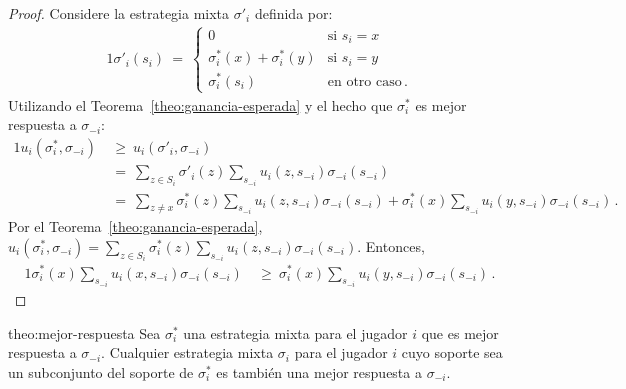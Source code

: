 \begin{proof}
Considere la estrategia mixta $\sigma'_i$ definida por:
\begin{alignat}{1}
	\sigma'_{i}(s_i)\ =\  
	\begin{cases}
		0 &  \text{si } s_i = x \\
		\sigma^*_i(x) + \sigma^*_i(y) & \text{si } s_i = y \\
		\sigma^*_i(s_i) & \text{en otro caso} \,. 
	\end{cases}
\end{alignat}
Utilizando el Teorema~\ref{theo:ganancia-esperada} y el hecho que $\sigma^*_i$ es mejor respuesta a $\sigma_{-i}$:
\begin{alignat}{1}
  u_i(\sigma^*_i, \sigma_{-i})\ 
    &\geq\ u_i(\sigma'_i, \sigma_{-i}) \\
    &=\ \sum_{z \in S_i} \sigma'_i(z) \sum_{s_{-i}} u_i(z,s_{-i}) \sigma_{-i}(s_{-i}) \\
    &=\ \sum_{z\neq x} \sigma^*_i(z) \sum_{s_{-i}} u_i(z,s_{-i}) \sigma_{-i}(s_{-i}) + \sigma^*_i(x)\sum_{s_{-i}} u_i(y,s_{-i})\sigma_{-i}(s_{-i}) \,.
\end{alignat}
Por el Teorema~\ref{theo:ganancia-esperada},
$u_i(\sigma^*_i, \sigma_{-i})=\sum_{z \in S_i} \sigma^*_i(z) \sum_{s_{-i}} u_i(z,s_{-i}) \sigma_{-i}(s_{-i})$. Entonces,
\begin{alignat}{1}
  \label{eq:ineq-ganancias}
  \sigma^*_i(x) \sum_{s_{-i}} u_i(x,s_{-i}) \sigma_{-i}(s_{-i})\
    &\geq\ \sigma^*_i(x)\sum_{s_{-i}} u_i(y,s_{-i}) \sigma_{-i}(s_{-i}) \,.
\end{alignat}
\end{proof}


\begin{reptheorem}{theo:mejor-respuesta}
Sea $\sigma^*_i$ una estrategia mixta para el jugador $i$ que es mejor respuesta a $\sigma_{-i}$. Cualquier estrategia mixta $\sigma_i$ para el jugador $i$ cuyo soporte sea un subconjunto del soporte de $\sigma^*_i$ es también una mejor respuesta a $\sigma_{-i}$.
\end{reptheorem}

